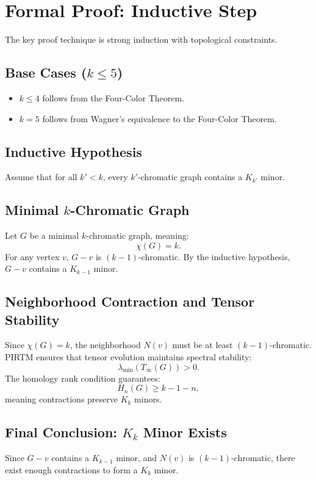 \documentclass{article}
\theoremstyle{plain}
\begin{document}
\section{Formal Proof: Inductive Step}

The key proof technique is strong induction with topological constraints.

\subsection{Base Cases ($k \leq 5$)}
\begin{itemize}
    \item $k \leq 4$ follows from the Four-Color Theorem.
    \item $k = 5$ follows from Wagner’s equivalence to the Four-Color Theorem.
\end{itemize}

\subsection{Inductive Hypothesis}
Assume that for all $k' < k$, every $k'$-chromatic graph contains a $K_{k'}$ minor.

\subsection{Minimal $k$-Chromatic Graph}
Let $G$ be a minimal $k$-chromatic graph, meaning:
\begin{equation}
    \chi(G) = k.
\end{equation}
For any vertex $v$, $G - v$ is $(k-1)$-chromatic.
By the inductive hypothesis, $G - v$ contains a $K_{k-1}$ minor.

\subsection{Neighborhood Contraction and Tensor Stability}
Since $\chi(G) = k$, the neighborhood $N(v)$ must be at least $(k-1)$-chromatic.
PIRTM ensures that tensor evolution maintains spectral stability:
\begin{equation}
    \lambda_{\min}(T_\infty(G)) > 0.
\end{equation}
The homology rank condition guarantees:
\begin{equation}
    H_n(G) \geq k - 1 - n,
\end{equation}
meaning contractions preserve $K_k$ minors.

\subsection{Final Conclusion: $K_k$ Minor Exists}
Since $G - v$ contains a $K_{k-1}$ minor, and $N(v)$ is $(k-1)$-chromatic, there exist enough contractions to form a $K_k$ minor.
\end{document}
